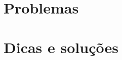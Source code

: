 \documentclass[brazilian,a4paper]{scrartcl}
\author{\gitAuthorName}
\title{\gato{   Análise complexa   }\gato}
\date{\textrm{\gitAbbrevHash} \quad (\gitAuthorDate)}
\begin{document}
\maketitle
\tableofcontents

\appendix
\newpage
\section{Problemas}

\newpage
\section{Dicas e soluções}

\end{document}
